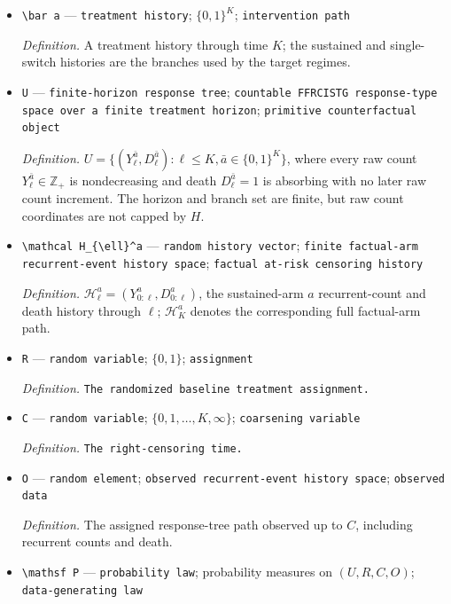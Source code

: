 \documentclass{article}
\begin{document}
\begin{itemize}
  \item \texttt{\textbackslash{}\allowbreak{}bar a} --- \texttt{treatment history}; \(\{0,1\}^{K}\); \texttt{intervention path}
  \par\smallskip\noindent\emph{Definition.} A treatment history through time \(K\); the sustained and single-switch histories are the branches used by the target regimes.
  \item \texttt{U} --- \texttt{finite-\allowbreak{}horizon response tree}; \texttt{countable FFRCISTG response-\allowbreak{}type space over a finite treatment horizon}; \texttt{primitive counterfactual object}
  \par\smallskip\noindent\emph{Definition.} \(U=\{(Y_{\ell}^{\bar a},D_{\ell}^{\bar a}):\ell\le K,\bar a\in\{0,1\}^{K}\}\), where every raw count \(Y_{\ell}^{\bar a}\in\mathbb Z_+\) is nondecreasing and death \(D_{\ell}^{\bar a}=1\) is absorbing with no later raw count increment. The horizon and branch set are finite, but raw count coordinates are not capped by \(H\).
  \item \texttt{\textbackslash{}\allowbreak{}mathcal H\_\allowbreak{}\{\textbackslash{}\allowbreak{}ell\}\allowbreak{}\textasciicircum{}a} --- \texttt{random history vector}; \texttt{finite factual-\allowbreak{}arm recurrent-\allowbreak{}event history space}; \texttt{factual at-\allowbreak{}risk censoring history}
  \par\smallskip\noindent\emph{Definition.} \(\mathcal H_{\ell}^a=(Y_{0:\ell}^a,D_{0:\ell}^a)\), the sustained-arm \(a\) recurrent-count and death history through \(\ell\); \(\mathcal H_K^a\) denotes the corresponding full factual-arm path.
  \item \texttt{R} --- \texttt{random variable}; \(\{0,1\}\); \texttt{assignment}
  \par\smallskip\noindent\emph{Definition.} \texttt{The randomized baseline treatment assignment.}
  \item \texttt{C} --- \texttt{random variable}; \(\{0,1,\ldots,K,\infty\}\); \texttt{coarsening variable}
  \par\smallskip\noindent\emph{Definition.} \texttt{The right-\allowbreak{}censoring time.}
  \item \texttt{O} --- \texttt{random element}; \texttt{observed recurrent-\allowbreak{}event history space}; \texttt{observed data}
  \par\smallskip\noindent\emph{Definition.} The assigned response-tree path observed up to \(C\), including recurrent counts and death.
  \item \texttt{\textbackslash{}\allowbreak{}mathsf P} --- \texttt{probability law}; probability measures on \((U,R,C,O)\); \texttt{data-\allowbreak{}generating law}

\end{itemize}
\end{document}

